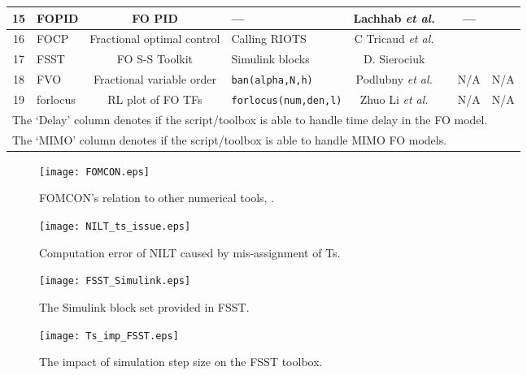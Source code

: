 \documentclass[11pt]{tCON2e}
\theoremstyle{plain}\newtheorem{theorem}{Theorem}
\theoremstyle{definition}
\theoremstyle{remark}
\begin{document}
\begin{landscape}
\begin{table}[h]
\begin{center}
\begin{tabular}{|c| l|c|l|c|c|c|c|}
\hline
15   & FOPID           &  FO PID                &  ---                          & Lachhab \emph{et al.}         & \cite{ref:Nabil_FOPID}         & --- &  \\
\hline
16   & FOCP            &  {\footnotesize Fractional optimal control}   & Calling RIOTS  &{\small C Tricaud \emph{et al.}} & \cite{ref:FOCP_Tricaud} &  &  \\
\hline
17   & FSST            &  FO S-S Toolkit        &  Simulink blocks              & D. Sierociuk  & \cite{ref:fsst_1_7}   &  &  \\
\hline
18   & FVO             & {\footnotesize F}ractional variable order  & {\tt ban(alpha,N,h)}   & Podlubny \emph{et al.} & \cite{ref:Igor_matrix_approach}   & N/A & N/A     \\
\hline
19   & forlocus        & RL plot of FO TFs      & {\tt forlocus(num,den,l)}   & Zhuo Li \emph{et al.}        & \cite{ref:FO_RL_mine}                             & N/A & N/A     \\
\hline
\multicolumn{8}{l}{The `Delay' column denotes if the script/toolbox is able to handle time delay in the FO model.} \\
\multicolumn{8}{l}{The `MIMO' column denotes if the script/toolbox is able to handle MIMO FO models.}
\end{tabular}
\end{center}
\end{table}
\end{landscape}





\begin{figure}[h]
\centering
\texttt{[image: FOMCON.eps]}
\caption{FOMCON's relation to other numerical tools, \cite{ref:FO_ID_MS_Thesis}.}
\label{fig:FOMCON_relation}
\end{figure}

\begin{figure}[h]
\centering
\texttt{[image: NILT\_ts\_issue.eps]}
\caption{Computation error of NILT caused by mis-assignment of Ts.}
\label{fig:NILT_ts_issue}
\end{figure}

\begin{figure}[h]
\centering
\texttt{[image: FSST\_Simulink.eps]}
\caption{The Simulink block set provided in FSST.}
\label{fig:FSST_Simulink}
\end{figure}


\begin{figure}[h]
\centering
\texttt{[image: Ts\_imp\_FSST.eps]}
\caption{The impact of simulation step size on the FSST toolbox.}
\label{fig:Ts_imp_FSST}
\end{figure}
\end{document}
